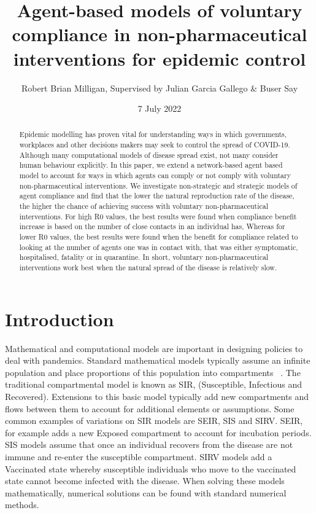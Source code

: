 \documentclass{article}
\title{Agent-based models of voluntary compliance in non-pharmaceutical interventions for epidemic control}
\author{Robert Brian Milligan, Supervised by Julian Garcia Gallego \& Buser Say}
\date{7 July 2022}
\begin{document}
\maketitle

\begin{abstract}
Epidemic modelling has proven vital for understanding ways in which governments, workplaces and other decisions makers may seek to control the spread of COVID-19. Although many computational models of disease spread exist, not many consider human behaviour explicitly. In this paper, we extend a network-based agent based model to account for ways in which agents can comply or not comply with voluntary non-pharmaceutical interventions. We investigate non-strategic and strategic models of agent compliance and find that the lower the natural reproduction rate of the disease, the higher the chance of achieving success with voluntary non-pharmaceutical interventions. For high R0 values, the best results were found when compliance benefit increase is based on the number of close contacts in an individual has, Whereas for lower R0 values, the best results were found when the benefit for compliance related to looking at the number of agents one was in contact with, that was either symptomatic, hospitalised, fatality or in quarantine. In short, voluntary non-pharmaceutical interventions work best when the natural spread of the disease is relatively slow.
\end{abstract}


\newpage 

\tableofcontents

\newpage 

\section{Introduction}

Mathematical and computational models are important in designing policies to deal with pandemics. 
Standard mathematical models typically assume an infinite population and place proportions of this population into compartments ~\cite{cooper_mondal_antonopoulos_2020}. 
The traditional compartmental model is known as SIR, (Susceptible, Infectious and Recovered). 
Extensions to this basic model typically add new compartments and flows between them to account for additional elements or assumptions. 
Some common examples of variations on SIR models are SEIR, SIS and SIRV. 
SEIR, for example adds a new Exposed compartment to account for incubation periods. 
SIS models assume that once an individual recovers from the disease are not immune and re-enter the susceptible compartment.
SIRV models add a Vaccinated state whereby susceptible individuals who move to the vaccinated state cannot become infected with the disease.
When solving these models mathematically, numerical solutions can be found with standard numerical methods. \newline
\end{document}
